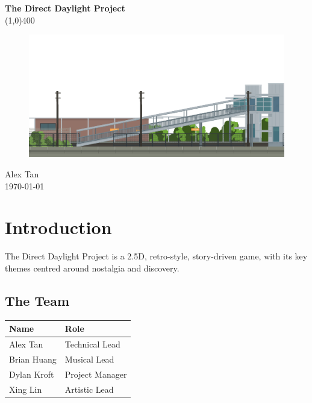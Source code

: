 \documentclass[11pt]{article}
\begin{document}
	
\begin{titlepage}
\begin{center}
\huge{\textbf{The Direct Daylight Project}}\\
\line(1,0){400}\\
\vfill{}
\begin{figure}[H]
\centering
\includegraphics[scale=1.0, width=\textwidth]{latex-images/direct-daylight.png}
\end{figure}
\vfill{}
\vfill{}
\Large{Alex Tan}\\
\Large{\today}\\
\end{center}
\thispagestyle{empty}
\end{titlepage}	

\tableofcontents
\thispagestyle{empty}
\clearpage

\setcounter{page}{1}

\section{Introduction}
The Direct Daylight Project is a 2.5D, retro-style, story-driven game, with its key themes centred around nostalgia and discovery.
\subsection{The Team}
\begin{center}
\begin{tabular}{ll}
\textbf{Name} & \textbf{Role} \\ 
\hline 
Alex Tan & Technical Lead \\
Brian Huang & Musical Lead \\
Dylan Kroft & Project Manager \\
Xing Lin & Artistic Lead
\end{tabular} 
\end{center}
\end{document}
